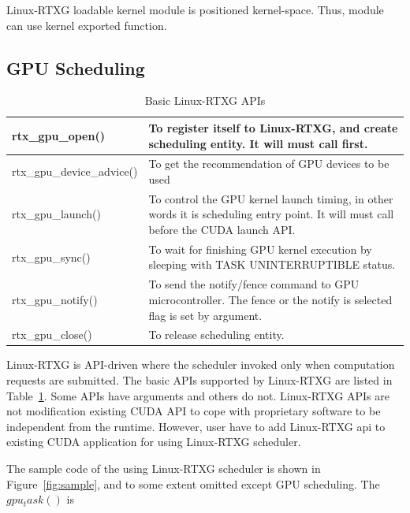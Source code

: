 Linux-RTXG loadable kernel module is positioned kernel-space.
Thus, module can use kernel exported function.

\subsection{GPU Scheduling}
\begin{table}[t]
\begin{center}
\caption{Basic Linux-RTXG APIs}
\label{tab:rtx-api}
\begin{tabular}{|l|p{50em}|} \hline
rtx\_gpu\_open() & To register itself to Linux-RTXG, and create scheduling entity. It will must call first. \\ \hline
rtx\_gpu\_device\_advice() & To get the recommendation of GPU devices to be used \\ \hline
rtx\_gpu\_launch() & To control the GPU kernel launch timing, in other words it is scheduling entry point. It will must call before the CUDA launch API. \\ \hline
rtx\_gpu\_sync() & To wait for finishing GPU kernel execution by sleeping with TASK UNINTERRUPTIBLE status.\\ \hline
rtx\_gpu\_notify() & To send the notify/fence command to GPU microcontroller. The fence or the notify is selected flag is set by argument.\\ \hline
rtx\_gpu\_close() & To release scheduling entity.\\ \hline
\end{tabular}
\end{center}
\end{table}

Linux-RTXG is API-driven where the scheduler invoked only when computation requests are submitted.
The basic APIs supported by Linux-RTXG are listed in Table~\ref{tab:rtx-api}.
Some APIs have arguments and others do not.
Linux-RTXG APIs are not modification existing CUDA API to cope with proprietary software to be independent from the runtime.
However, user have to add Linux-RTXG api to existing CUDA application for using Linux-RTXG scheduler.

The sample code of the using Linux-RTXG scheduler is shown in Figure~\ref{fig:sample},
and to some extent omitted except GPU scheduling.
The $gpu_task()$ is

